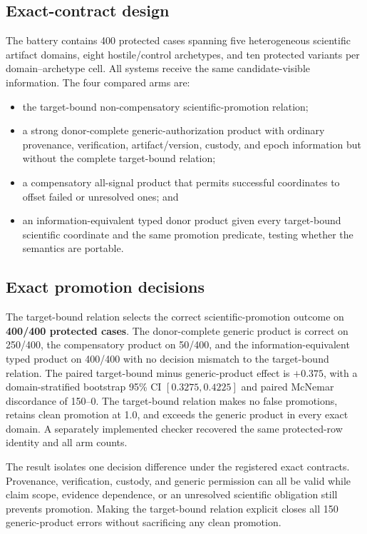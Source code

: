 \subsection{Exact-contract design}
The battery contains 400 protected cases spanning five heterogeneous scientific artifact domains, eight hostile/control archetypes, and ten protected variants per domain--archetype cell. All systems receive the same candidate-visible information. The four compared arms are:
\begin{itemize}
  \item the target-bound non-compensatory scientific-promotion relation;
  \item a strong donor-complete generic-authorization product with ordinary provenance, verification, artifact/version, custody, and epoch information but without the complete target-bound relation;
  \item a compensatory all-signal product that permits successful coordinates to offset failed or unresolved ones; and
  \item an information-equivalent typed donor product given every target-bound scientific coordinate and the same promotion predicate, testing whether the semantics are portable.
\end{itemize}

\subsection{Exact promotion decisions}
The target-bound relation selects the correct scientific-promotion outcome on \textbf{400/400 protected cases}. The donor-complete generic product is correct on 250/400, the compensatory product on 50/400, and the information-equivalent typed product on 400/400 with no decision mismatch to the target-bound relation. The paired target-bound minus generic-product effect is \textbf{$+0.375$}, with a domain-stratified bootstrap 95\% CI $[0.3275,0.4225]$ and paired McNemar discordance of 150--0. The target-bound relation makes no false promotions, retains clean promotion at 1.0, and exceeds the generic product in every exact domain. A separately implemented checker recovered the same protected-row identity and all arm counts.

The result isolates one decision difference under the registered exact contracts. Provenance, verification, custody, and generic permission can all be valid while claim scope, evidence dependence, or an unresolved scientific obligation still prevents promotion. Making the target-bound relation explicit closes all 150 generic-product errors without sacrificing any clean promotion.

